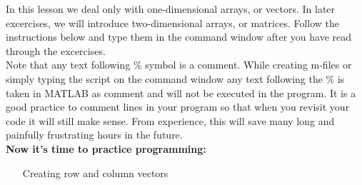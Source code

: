 \documentclass[paper=a4, fontsize=11pt]{scrartcl} %
\numberwithin{equation}{section} %
\numberwithin{figure}{section} %
\numberwithin{table}{section} %
\begin{document}
In this lesson we deal only with one-dimensional arrays, or vectors.
In later excercises, we will introduce two-dimensional arrays, or matrices. 
Follow the instructions below and type them in the command window after you have read through the excercises.\\

Note that any text following \% symbol is a comment. 
While creating m-files or simply typing
the script on the command window any text following the \% is taken in MATLAB as comment and will not be executed in the program. 
It is a good practice to comment lines in your program so that when you revisit your code it will still make sense. 
From experience, this will save many long and painfully frustrating hours in the future.\\

\textbf{Now it's time to practice programming:}

\begin{itemize}
\item[Creating row and column vectors]
\

\end{itemize}


\end{document}
